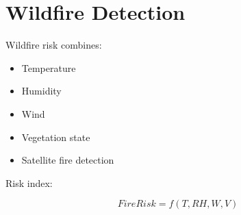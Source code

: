 \section{Wildfire Detection}


Wildfire risk combines:


\begin{itemize}

\item Temperature

\item Humidity

\item Wind

\item Vegetation state

\item Satellite fire detection

\end{itemize}



Risk index:


\begin{equation}
FireRisk=f(T,RH,W,V)
\end{equation}
